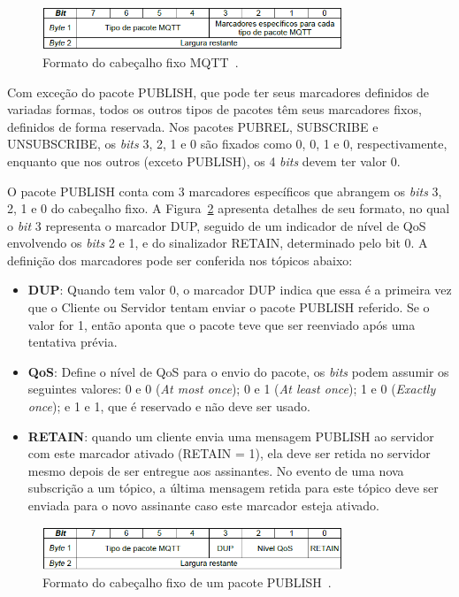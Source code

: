 \begin{figure}[ht]
	\centering
	\includegraphics[width=0.8\textwidth]{imagens/mqtt_pacFormat.png}
	\caption{Formato do cabeçalho fixo MQTT~\cite{mqttv3.1.1}.
		\label{fig:mqtt_pacFormat}}
\end{figure}
\FloatBarrier

Com exceção do pacote PUBLISH, que pode ter seus marcadores definidos de variadas formas, todos os outros tipos de pacotes têm seus marcadores fixos, definidos de forma reservada. Nos pacotes PUBREL, SUBSCRIBE e UNSUBSCRIBE, os \textit{bits} 3, 2, 1 e 0 são fixados como 0, 0, 1 e 0, respectivamente, enquanto que nos outros (exceto PUBLISH), os 4 \textit{bits} devem ter valor 0.

O pacote PUBLISH conta com 3 marcadores específicos que abrangem os \textit{bits} 3, 2, 1 e 0 do cabeçalho fixo. A Figura~\ref{fig:mqtt_pubFormat} apresenta detalhes de seu formato, no qual o \textit{bit} 3 representa o marcador DUP, seguido de um indicador de nível de QoS envolvendo os \textit{bits} 2 e 1, e do sinalizador RETAIN, determinado pelo bit 0. A definição dos marcadores pode ser conferida nos tópicos abaixo:

\begin{itemize}
	\item \textbf{DUP}: Quando tem valor 0, o marcador DUP indica que essa é a primeira vez que o Cliente ou Servidor tentam enviar o pacote PUBLISH referido. Se o valor for 1, então aponta que o pacote teve que ser reenviado após uma tentativa prévia.
	\item \textbf{QoS}: Define o nível de QoS para o envio do pacote, os \textit{bits} podem assumir os seguintes valores: 0 e 0 (\textit{At most once}); 0 e 1 (\textit{At least once}); 1 e 0 (\textit{Exactly once}); e 1 e 1, que é reservado e não deve ser usado.
	\item \textbf{RETAIN}: quando um cliente envia uma mensagem PUBLISH ao servidor com este marcador ativado (RETAIN = 1), ela deve ser retida no servidor mesmo depois de ser entregue aos assinantes. No evento de uma
	nova subscrição a um tópico, a última mensagem retida para este tópico deve ser enviada para o
	novo assinante caso este marcador esteja ativado.
\end{itemize}

\begin{figure}[ht]
	\centering
	\includegraphics[width=0.8\textwidth]{imagens/mqtt_pubFormat.png}
	\caption{Formato do cabeçalho fixo de um pacote PUBLISH~\cite{mqttv3.1.1}.
		\label{fig:mqtt_pubFormat}}
\end{figure}
\FloatBarrier

